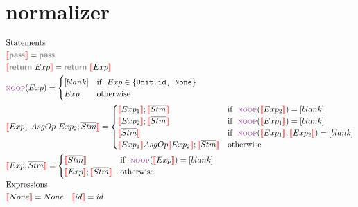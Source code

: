 \documentclass{thesis}
\newcommand{\gray}[1]{\textbf{\textsf{\color{Gray}#1}}}
\newcommand{\nl}[1]{{\color{red}{\llbracket}}#1{\color{red}{\rrbracket}}} %
\begin{document}
\section*{normalizer}
\begin{align*}
  & \text{Statements}\\
  & \nl{\gray{pass}} = \gray{pass}\\
  & \nl{\gray{return}~Exp} = \gray{return} ~ \nl{Exp}\\
  & {\scriptsize{\text{\color{Purple}NOOP}}}(Exp) = 
  \begin{cases}
    [blank] & \text{if}~~ Exp \in \{\texttt{Unit.id, None}\}\\
    Exp & \text{otherwise}
  \end{cases}\\
  & \nl{Exp_1 ~AsgOp~ Exp_2 ; \overline{Stm}} = 
  \begin{cases}
    \nl{Exp_1} ; \nl{\overline{Stm}} & \text{if}~~ {\scriptsize{\text{\color{Purple}NOOP}}}(\nl{Exp_2}) = [blank]\\
    \nl{Exp_2} ; \nl{\overline{Stm}} & \text{if}~~ {\scriptsize{\text{\color{Purple}NOOP}}}(\nl{Exp_1}) = [blank]\\
    \nl{\overline{Stm}} & \text{if}~~ {\scriptsize{\text{\color{Purple}NOOP}}}(\nl{Exp_1},\nl{Exp_2}) = [blank]\\
    \nl{Exp_1} AsgOp \nl{Exp_2} ; \nl{\overline{Stm}} & \text{otherwise}
  \end{cases}\\
  & \nl{Exp;\overline{Stm}} =
  \begin{cases}
    \nl{\overline{Stm}} & \text{if}~~ {\scriptsize{\text{\color{Purple}NOOP}}}(\nl{Exp}) = [blank]\\
    \nl{Exp} ; \nl{\overline{Stm}} & \text{otherwise}
  \end{cases}\\
  & \text{Expressions}\\
  & \nl{None} = None ~~~ \nl{id} = id 
\end{align*}
\end{document}
